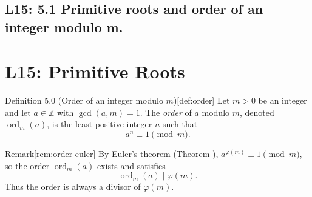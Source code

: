 \documentclass[10pt]{article}
\theoremstyle{definition}
\theoremstyle{plain}
\numberwithin{equation}{section}
\begin{document}
\newpage
\subsection{L15: 5.1 Primitive roots and order of an integer modulo m.}

\section*{L15: Primitive Roots}

\begin{define}{Definition 5.0 (Order of an integer modulo $m$)}[def:order]
Let $m>0$ be an integer and let $a\in\mathbb{Z}$ with $\gcd(a,m)=1$. The \emph{order} of $a$ modulo $m$, denoted $\operatorname{ord}_m(a)$, is the least positive integer $n$ such that
\[
a^n\equiv 1 \pmod m.
\]
\end{define}

\begin{define}{Remark}[rem:order-euler]
By Euler's theorem (Theorem ), $a^{\varphi(m)}\equiv 1\pmod m$, so the order $\operatorname{ord}_m(a)$ exists and satisfies
\[
\operatorname{ord}_m(a)\mid \varphi(m).
\]
Thus the order is always a divisor of $\varphi(m)$.
\end{define}
\end{document}

